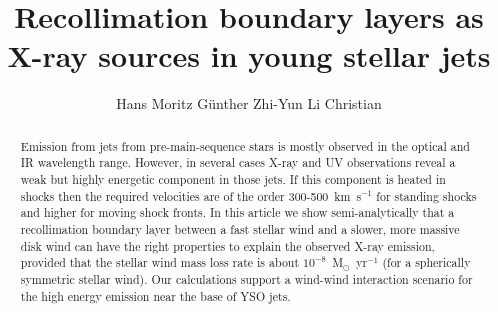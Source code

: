\documentclass[manuscript]{aastex}
\begin{document}

\title{Recollimation boundary layers as X-ray sources in young stellar jets}


\author{Hans Moritz G{\"{u}}nther Zhi-Yun Li Christian}

\begin{abstract}
Emission from jets from pre-main-sequence stars is mostly observed in
the optical and IR wavelength range. However, in several cases X-ray and
UV observations reveal a weak but highly energetic component in those
jets. If this component is heated in shocks then the required velocities
are of the order 300-500~km~s$^{-1}$ for standing shocks and higher for
moving shock fronts. In this article we show semi-analytically that a
recollimation boundary layer between a fast stellar wind and a slower,
more massive disk wind can have the right properties to explain the
observed X-ray emission, provided that the stellar wind mass loss rate
is about $10^{-8}$~M$_{\odot}$~yr$^{-1}$ (for a spherically symmetric
stellar wind). Our calculations support a wind-wind interaction scenario
for the high energy emission near the base of YSO jets.

\end{abstract}







\end{document}
